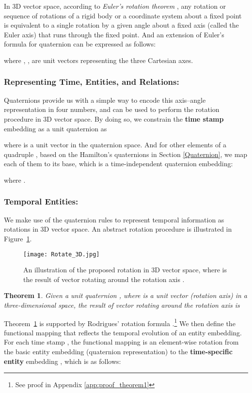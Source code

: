 \documentclass[11pt]{article}
\newtheorem{theorem}{Theorem}
\begin{document}
In 3D vector space, according to \emph{Euler's rotation theorem} \cite{euler1776novi,verhoeff2014euler}, any rotation or sequence of rotations of a rigid body or a coordinate system about a fixed point is equivalent to a single rotation by a given angle  about a fixed axis (called the Euler axis) that runs through the fixed point.
And an extension of Euler's formula for quaternion can be expressed as follows:

where , ,  are unit vectors representing the three Cartesian axes.

\subsubsection{Representing Time, Entities, and Relations:}
Quaternions provide us with a simple way to encode this axis–angle representation in four numbers, and can be used to perform the rotation procedure in 3D vector space.
By doing so, we constrain the \textbf{time stamp} embedding  as a unit quaternion as 

where  is a unit vector in the quaternion space.
And for other elements of a quadruple , based on the Hamilton's quaternions in Section \ref{Quaternion}, we map each of them to its base, which is a time-independent quaternion embedding:

where .

\subsubsection{Temporal Entities:}
We make use of the quaternion rules to represent temporal information as rotations in 3D vector space.
An abstract rotation procedure is illustrated in Figure~\ref{figure:rotation}.

\begin{figure}[t]
\centering
\texttt{[image: Rotate\_3D.jpg]} 
\caption{An illustration of the proposed rotation in 3D vector space, where  is the result of vector  rotating  around the rotation axis .}
\label{figure:rotation}
\end{figure}

\begin{theorem} \label{Theorem_rotation}
Given a unit quaternion , where  is a unit  vector (rotation axis) in a three-dimensional space, the result of vector  rotating  around the rotation axis  is

\end{theorem}

Theorem~\ref{Theorem_rotation} is supported by Rodrigues' rotation formula \cite{rodrigues1840lois}.\footnote{See proof in Appendix \ref{app:proof_theorem1}}
We then define the functional mapping that reflects the temporal evolution of an entity embedding. For each time stamp , the functional mapping is an element-wise rotation from the basic entity embedding  (quaternion representation) to the \textbf{time-specific entity} embedding , which is as follows:
\end{document}
